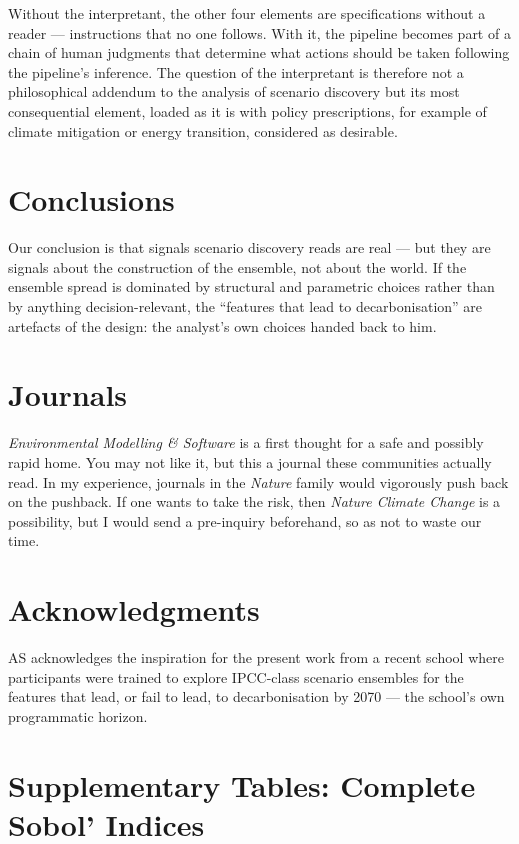 \documentclass[sn-basic]{sn-jnl}%
\begin{document}
Without the interpretant, the other four elements are specifications without a reader --- instructions that no one follows. With it, the pipeline becomes part of a chain of human judgments that determine what actions should be taken following the pipeline's inference. The question of the interpretant is therefore not a philosophical addendum to the analysis of scenario discovery but its most consequential element, loaded as it is with policy prescriptions, for example of climate mitigation or energy transition, considered as desirable. 




\section{Conclusions}
Our conclusion is that 
signals scenario discovery reads are real --- but they are signals about the construction of the ensemble, not about the world. If the ensemble spread is
dominated by structural and parametric choices rather than by anything
decision-relevant, the ``features that lead to decarbonisation'' are artefacts
of the design: the analyst's own choices handed back to him.


\section{Journals}\textit{Environmental Modelling \& Software} is a first thought for a safe and possibly rapid home. You may not like it, but this a journal these communities actually read. In my experience, journals in the \textit{Nature} family would vigorously push back on the pushback. If one wants to take the risk, then \textit{Nature Climate Change} is a possibility, but I would send a pre-inquiry beforehand, so as not to waste our time.


\section{Acknowledgments}
AS acknowledges the inspiration for the present work from a recent school
\citep{university_of_geneva_prisma_2026} where participants were trained to
explore IPCC-class scenario ensembles for the features that lead, or fail to
lead, to decarbonisation by 2070 --- the school's own programmatic horizon.

%
%


\appendix
\section{Supplementary Tables: Complete Sobol' Indices}
\label{app:sobol_tables}
\end{document}

